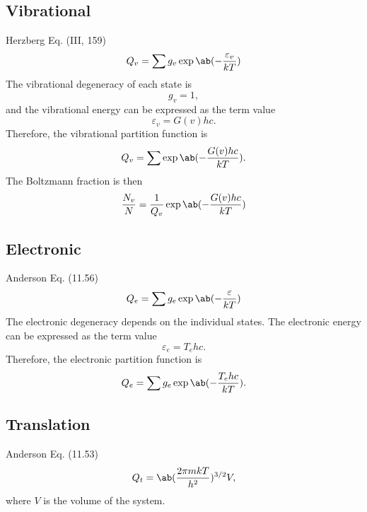 \documentclass[11pt, twoside, fleqn]{report}
\begin{document}
\subsection{Vibrational}

Herzberg Eq. (III, 159)
\begin{equation*}
    Q_{v} = \sum g_{v}\exp\ab(-\frac{\varepsilon_{v}}{kT})
\end{equation*}
The vibrational degeneracy of each state is
\begin{equation*}
    g_{v} = 1,
\end{equation*}
and the vibrational energy can be expressed as the term value
\begin{equation*}
    \varepsilon_{v} = G(v)hc.
\end{equation*}
Therefore, the vibrational partition function is
\begin{equation*}
    Q_{v} = \sum \exp\ab(-\frac{G(v)hc}{kT}).
\end{equation*}
The Boltzmann fraction is then
\begin{equation*}
    \frac{N_{v}}{N} = \frac{1}{Q_{v}}\exp\ab(-\frac{G(v)hc}{kT})
\end{equation*}

\subsection{Electronic}

Anderson Eq. (11.56)
\begin{equation*}
    Q_{e} = \sum g_{e}\exp\ab(-\frac{\varepsilon}{kT})
\end{equation*}
The electronic degeneracy depends on the individual states. The electronic energy can be expressed as the term value
\begin{equation*}
    \varepsilon_{e} = T_{e}hc.
\end{equation*}
Therefore, the electronic partition function is
\begin{equation*}
    Q_{e} = \sum g_{e}\exp\ab(-\frac{T_{e}hc}{kT}).
\end{equation*}

\subsection{Translation}

Anderson Eq. (11.53)
\begin{equation*}
    Q_{t} = \ab(\frac{2\pi mkT}{h^{2}})^{3/2}V,
\end{equation*}
where $V$ is the volume of the system.
\end{document}
